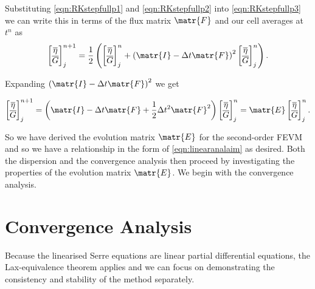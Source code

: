 Substituting \eqref{eqn:RKstepfullp1} and \eqref{eqn:RKstepfullp2} into \eqref{eqn:RKstepfullp3} we can write this in terms of the flux matrix $\matr{F}$ and our cell averages at $t^n$ as
\begin{equation*}
\begin{bmatrix}
\overline{\eta} \\ \overline{G}
\end{bmatrix}^{n+1}_j = \frac{1}{2} \left(\begin{bmatrix}
\overline{\eta} \\ \overline{G}
\end{bmatrix}^{n}_j + \left(\matr{I} - \Delta t\matr{F} \right)^2 \begin{bmatrix}
\overline{\eta} \\ \overline{G}
\end{bmatrix}^{n}_j\right).
\end{equation*}

Expanding $\left(\matr{I} - \Delta t\matr{F} \right)^2$ we get

\begin{equation}
\begin{bmatrix}
\overline{\eta} \\ \overline{G}
\end{bmatrix}^{n+1}_j = \left(\matr{I}  -\Delta t\matr{F} + \frac{1}{2}\Delta t^2\matr{F}^2 \right) \begin{bmatrix}
\overline{\eta} \\ \overline{G}
\end{bmatrix}^{n}_j = \matr{E}\begin{bmatrix}
\overline{\eta} \\ \overline{G}
\end{bmatrix}^{n}_j.
\label{eqn:evolutionmatrix}
\end{equation}

So we have derived the evolution matrix $\matr{E}$ for the second-order FEVM and so we have a relationship in the form of \eqref{eqn:linearanalaim} as desired. Both the dispersion and the convergence analysis then proceed by investigating the properties of the evolution matrix $\matr{E}$. We begin with the convergence analysis.

\section{Convergence Analysis}
Because the linearised Serre equations are linear partial differential equations, the Lax-equivalence theorem applies and we can focus on demonstrating the consistency and stability of the method separately. 

